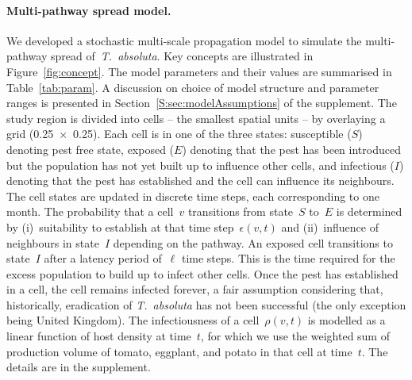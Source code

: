 \documentclass[11pt]{article}
\newcommand{\tuta}{\emph{T.~absoluta}}
\newcommand{\infest}{\rho}
\newcommand{\suitable}{\epsilon}
\theoremstyle{definition}
\begin{document}
\paragraph{Multi-pathway spread model.} We developed a stochastic
multi-scale propagation model to simulate the multi-pathway spread
of~\tuta{}. Key concepts are illustrated in Figure~\ref{fig:concept}. The
model parameters and their values are summarised in Table~\ref{tab:param}.
A discussion on choice of model structure and parameter ranges is presented
in Section~\ref{S:sec:modelAssumptions} of the supplement. The study region
is divided into cells -- the smallest spatial units -- by overlaying a grid
(0.25\textdegree~$\times$~0.25\textdegree). Each cell is in one of the
three states: susceptible ($S$) denoting pest free state, exposed ($E$)
denoting that the pest has been introduced but the population has not yet
built up to influence other cells, and infectious ($I$) denoting that the
pest has established and the cell can influence its neighbours. The cell
states are updated in discrete time steps, each corresponding to one month.
The probability that a cell~$v$ transitions from state~$S$ to~$E$ is
determined by (i)~suitability to establish at that time
step~$\suitable(v,t)$ and (ii)~influence of neighbours in state~$I$
depending on the pathway. An exposed cell transitions to state~$I$ after a
latency period of~$\ell$ time steps. This is the time required for the
excess population to build up to infect other cells. Once the pest has
established in a cell, the cell remains infected forever, a fair assumption
considering that, historically, eradication of \tuta{} has not been
successful (the only exception being United Kingdom). The infectiousness of
a cell~$\infest(v,t)$ is modelled as a linear function of host density at
time~$t$, for which we use the weighted sum of production volume of tomato,
eggplant, and potato in that cell at time~$t$. The details are in the
supplement.
\end{document}
